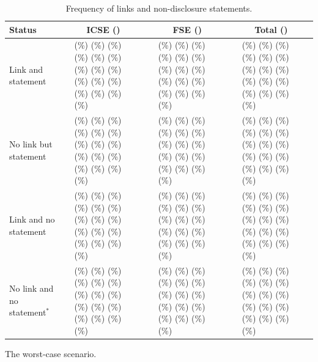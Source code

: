\documentclass{article}
\newlength\BARSIZE  \setlength\BARSIZE{0.9cm}
\newcommand*\ChartWithAbsoluteAndPercentageNumbers[2]{
    \numprint{#1}&\ShowPercentageNoHundred{#1}{#2}&\inlinechart{#1}{#2}}
\newcommand{\inlinechart}[2]{%
\FPeval{\BLACKBARSIZE}{#1/#2}\textcolor{black!80}{\rule{\BLACKBARSIZE\BARSIZE}{1.6ex}}%
\FPeval{\BLACKBARSIZE}{1 - (#1/#2)}\textcolor{black!10}{\rule{\BLACKBARSIZE\BARSIZE}{1.6ex}}%
}
\newcommand{\ShowPercentageNoHundred}[2]{%
    \FPeval\percentage{round(#1/#2*100,1)}%
    \FPeval\percentageRounded{round(#1/#2*100,0)}%
    \ifthenelse
        {\equal{\percentageRounded}{0}}%
        {(\hspace*{4.3pt}\FPprint{percentage}\%)}%
        {%
        \ifthenelse
            {\equal{\percentageRounded}{1}}%
            {(\hspace*{4.3pt}\FPprint{percentage}\%)}%
            {%
            \ifthenelse
                {\equal{\percentageRounded}{2}}%
                {(\hspace*{4.3pt}\FPprint{percentage}\%)}%
                {%
                \ifthenelse
                    {\equal{\percentageRounded}{3}}%
                    {(\hspace*{4.3pt}\FPprint{percentage}\%)}%
                    {%
                    \ifthenelse
                        {\equal{\percentageRounded}{4}}%
                        {(\hspace*{4.3pt}\FPprint{percentage}\%)}%
                        {%
                        \ifthenelse
                            {\equal{\percentageRounded}{5}}%
                            {(\hspace*{4.3pt}\FPprint{percentage}\%)}%
                            {%
                            \ifthenelse
                                {\equal{\percentageRounded}{6}}%
                                {(\hspace*{4.3pt}\FPprint{percentage}\%)}%
                                {%
                                \ifthenelse
                                    {\equal{\percentageRounded}{7}}%
                                    {(\hspace*{4.3pt}\FPprint{percentage}\%)}%
                                    {%
                                    \ifthenelse
                                        {\equal{\percentageRounded}{8}}%
                                        {(\hspace*{4.3pt}\FPprint{percentage}\%)}%
                                        {%
                                        \ifthenelse
                                            {\equal{\percentageRounded}{9}}%
                                            {(\hspace*{4.3pt}\FPprint{percentage}\%)}%
                                            {%
                                            \ifthenelse
                                                {\equal{\percentage}{9.5}}%
                                                {(\hspace*{4.3pt}\FPprint{percentage}\%)}%
                                                {%
                                                \ifthenelse
                                                    {\equal{\percentage}{9.6}}%
                                                    {(\hspace*{4.3pt}\FPprint{percentage}\%)}%
                                                    {%
                                                    \ifthenelse
                                                        {\equal{\percentage}{9.7}}%
                                                        {(\hspace*{4.3pt}\FPprint{percentage}\%)}%
                                                        {%
                                                        \ifthenelse
                                                            {\equal{\percentage}{9.8}}%
                                                            {(\hspace*{4.3pt}\FPprint{percentage}\%)}%
                                                            {%
                                                            \ifthenelse
                                                                {\equal{\percentage}{9.9}}%
                                                                {(\hspace*{4.3pt}\FPprint{percentage}\%)}%
                                                                {%
                                                                    (\FPprint{percentage}\%)
                                                                }%
                                                            }%
                                                        }%
                                                    }%
                                                }%
                                            }%
                                        }%
                                    }%
                                }%
                            }%
                        }%
                    }%
                }%
            }%
        }%
}%
\begin{document}

\FPeval{}
\FPeval{}
\FPeval{}
\FPeval{}
\FPeval{}
\FPeval{}
\FPeval{}
\FPeval{}
\FPeval{}
\FPeval{}
\FPeval{}
\FPeval{}
\FPeval{}
\FPeval{}
\FPeval{}

\setcounter{table}{8}%


\begin{table}[htbp]
\caption{Frequency of links and non-disclosure statements.}
\label{tab:frequency-links-and-statements}
\centering
\small
\begin{threeparttable}
\begin{tabular}{@{} l  @{\hskip 0.2in} r @{\hskip 0.04in} l @{\hskip 0.7mm} l @{\hskip 0.2in} r @{\hskip 0.04in} l @{\hskip 0.7mm} l @{\hskip 0.2in} r @{\hskip 0.04in} l @{\hskip 0.7mm} l @{}}
\toprule
Status &
  \multicolumn{3}{c}{ICSE (\numprint{\varTotalOfPapersICSE})} &
  \multicolumn{3}{c}{FSE (\numprint{\varTotalOfPapersFSE})} &
  \multicolumn{3}{c}{Total (\numprint{\varTotalOfPapersICSEFSE})} \\ 
  \midrule
Link and statement &
  \ChartWithAbsoluteAndPercentageNumbers{\varLinkYesStatementYesICSE}{\varTotalOfPapersICSE} &
  \ChartWithAbsoluteAndPercentageNumbers{\varLinkYesStatementYesFSE}{\varTotalOfPapersFSE} &
  \ChartWithAbsoluteAndPercentageNumbers{\varLinkYesStatementYesICSEFSE}{\varTotalOfPapersICSEFSE}
  \\
No link but statement &
  \ChartWithAbsoluteAndPercentageNumbers{\varLinkNoStatementYesICSE}{\varTotalOfPapersICSE} &
  \ChartWithAbsoluteAndPercentageNumbers{\varLinkNoStatementYesFSE}{\varTotalOfPapersFSE} &
  \ChartWithAbsoluteAndPercentageNumbers{\varLinkNoStatementYesICSEFSE}{\varTotalOfPapersICSEFSE}
  \\
Link and no statement &
  \ChartWithAbsoluteAndPercentageNumbers{\varLinkYesStatementNoICSE}{\varTotalOfPapersICSE} &
  \ChartWithAbsoluteAndPercentageNumbers{\varLinkYesStatementNoFSE}{\varTotalOfPapersFSE} &
  \ChartWithAbsoluteAndPercentageNumbers{\varLinkYesStatementNoICSEFSE}{\varTotalOfPapersICSEFSE}
  \\
No link and no statement$^*$ &
  \ChartWithAbsoluteAndPercentageNumbers{\varLinkNoStatementNoICSE}{\varTotalOfPapersICSE} &
  \ChartWithAbsoluteAndPercentageNumbers{\varLinkNoStatementNoFSE}{\varTotalOfPapersFSE} &
  \ChartWithAbsoluteAndPercentageNumbers{\varLinkNoStatementNoICSEFSE}{\varTotalOfPapersICSEFSE}
  \\ 
  \bottomrule
\end{tabular}
\begin{tablenotes}[flushleft]
            \item[*]{\footnotesize{The worst-case scenario.}}
\end{tablenotes}
\end{threeparttable}
\end{table}
\end{document}
